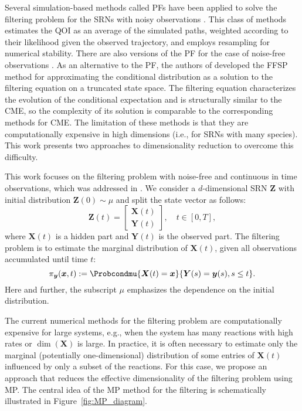 Several simulation-based methods called \acfp{PF} have been applied to solve the filtering problem for the \acp{SRN} with noisy observations \cite{Fang2022PF, Fang2023RPF}. This class of methods estimates the \ac{QOI} as an average of the simulated paths, weighted according to their likelihood given the observed trajectory, and employs resampling for numerical stability. There are also versions of the \ac{PF} for the case of noise-free observations \cite{Rathinam2021PFwithExactState, Rathinam2023TargetingAlg}. As an alternative to the \ac{PF}, the authors of \cite{DAmbrosio2022FFSP} developed the \acf{FFSP} method for approximating the conditional distribution as a solution to the filtering equation on a truncated state space. The filtering equation characterizes the evolution of the conditional expectation and is structurally similar to the \ac{CME}, so the complexity of its solution is comparable to the corresponding methods for \ac{CME}. The limitation of these methods is that they are computationally expensive in high dimensions (i.e., for \acp{SRN} with many species). This work presents two approaches to dimensionality reduction to overcome this difficulty. 

This work focuses on the filtering problem with noise-free and continuous in time observations, which was addressed in \cite{Rathinam2021PFwithExactState, Duso2018SelectedNodeSSA, Fang2022CMEmodularization}. We consider a $d$-dimensional \ac{SRN} $\boldsymbol{Z}$ with initial distribution $\boldsymbol{Z}(0) \sim \mu$ and split the state vector as follows:
$$
    \boldsymbol{Z}(t) = \begin{bmatrix}\boldsymbol{X}(t) \\ \boldsymbol{Y}(t) \end{bmatrix}, \quad t \in [0, T],
$$
where $\boldsymbol{X}(t)$ is a hidden part and $\boldsymbol{Y}(t)$ is the observed part. The filtering problem is to estimate the marginal distribution of $\boldsymbol{X}(t)$, given all observations accumulated until time $t$:
\begin{equation}
\nonumber
    \pi_{\boldsymbol{y}} (\boldsymbol{x}, t) := \Probcondmu{\boldsymbol{X}(t) = \boldsymbol{x} }{ \boldsymbol{Y}(s) = \boldsymbol{y}(s), s \leq t }.
\end{equation}
Here and further, the subscript $\mu$ emphasizes the dependence on the initial distribution.

The current numerical methods for the filtering problem are computationally expensive for large systems, e.g., when the system has many reactions with high rates or $\dim (\boldsymbol{X})$ is large. In practice, it is often necessary to estimate only the  marginal (potentially one-dimensional) distribution of some entries of $\boldsymbol{X}(t)$ influenced by only a subset of the reactions. For this case, we propose an approach that reduces the effective dimensionality of the filtering problem using \ac{MP}. The central idea of the \ac{MP} method for the filtering is schematically illustrated in Figure~\ref{fig:MP_diagram}.

